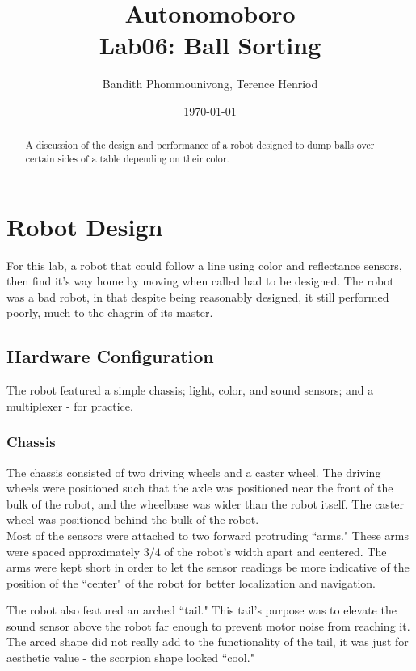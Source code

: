 \documentclass{article}
\title{Autonomoboro \\ Lab06: Ball Sorting}
\author{Bandith Phommounivong, Terence Henriod}
\date{\today}
\begin{document}
\maketitle

\begin{abstract}
A discussion of the design and performance of a robot designed to dump balls over certain sides of a table depending on their color.
\end{abstract}

\newpage
\section{Robot Design}
For this lab, a robot that could follow a line using color and reflectance sensors, then find it's way home by moving when called had to be designed. The robot was a bad robot, in that despite being reasonably designed, it still performed poorly, much to the chagrin of its master.

\subsection{Hardware Configuration}
The robot featured a simple chassis; light, color, and sound sensors; and a multiplexer - for practice.

\subsubsection{Chassis}
The chassis consisted of two driving wheels and a caster wheel. The driving wheels were positioned such that the axle was positioned near the front of the bulk of the robot, and the wheelbase was wider than the robot itself. The caster wheel was positioned behind the bulk of the robot. \\

Most of the sensors were attached to two forward protruding ``arms." These arms were spaced approximately $3/4$ of the robot's width apart and centered. The arms were kept short in order to let the sensor readings be more indicative of the position of the ``center" of the robot for better localization and navigation.

The robot also featured an arched ``tail." This tail's purpose was to elevate the sound sensor above the robot far enough to prevent motor noise from reaching it. The arced shape did not really add to the functionality of the tail, it was just for aesthetic value - the scorpion shape looked ``cool."
\end{document}
